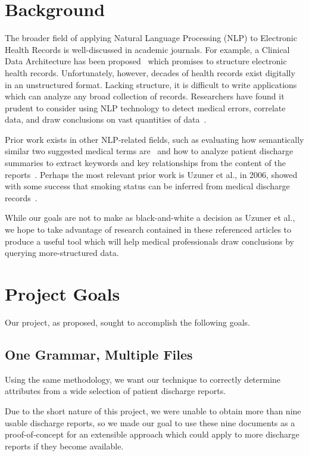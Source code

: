 \documentclass{acm_proc_article-sp}
\begin{document}
\section{Background}
The broader field of applying Natural Language Processing (NLP) to Electronic Health Records
is well-discussed in academic journals. For example, a Clinical Data Architecture has been
proposed~\cite{CDA} which promises to structure electronic health records. Unfortunately, however,
decades of health records exist digitally in an unstructured format. Lacking structure, it is
difficult to write applications which can analyze any broad collection of records. Researchers
have found it prudent to consider using NLP technology to detect medical errors, correlate data, 
and draw conclusions on vast quantities of data~\cite{friedman}.

Prior work exists in other NLP-related fields, such as evaluating how semantically similar 
two suggested medical terms are~\cite{Pedersen2007288} and how to analyze patient
discharge summaries to extract keywords and key relationships from the content of the
reports~\cite{soderland}. Perhaps the most relevant prior work is Uzuner et al., in 2006,
showed with some success that smoking status can be inferred from medical discharge 
records~\cite{Uzuner200814}.

While our goals are not to make as black-and-white a decision as Uzuner et al., we hope to take 
advantage of research contained in these referenced articles to produce a useful tool which will
help medical professionals draw conclusions by querying more-structured data.

\section{Project Goals}
Our project, as proposed, sought to accomplish the following goals.
\subsection{One Grammar, Multiple Files}
Using the same methodology, we want our technique to correctly determine attributes from a wide selection
of patient discharge reports.

Due to the short nature of this project, we were unable to obtain more than nine usable discharge reports,
so we made our goal to use these nine documents as a proof-of-concept for an extensible approach which
could apply to more discharge reports if they become available.
\end{document}
